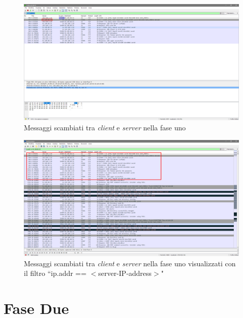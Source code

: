 \documentclass[a4paper, 12pt]{report}
\begin{document}
\begin{figure}[H]
	\centering
	\includegraphics[width=\linewidth]{images/image2_1.png}
	\caption{Messaggi scambiati tra \textit{client} e \textit{server} nella fase uno}
\end{figure}

\begin{figure}[H]
	\centering
	\includegraphics[width=\linewidth]{images/image2_1_1.png}
	\caption{Messaggi scambiati tra \textit{client} e \textit{server} nella fase uno visualizzati con il filtro ``ip.addr == $<$server-IP-address$>$"}
\end{figure}

\section{Fase Due}
\end{document}
